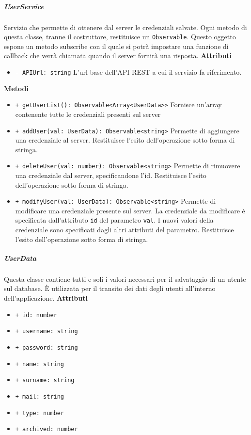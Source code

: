 \subparagraph{UserService}
Servizio che permette di ottenere dal server le credenziali salvate. Ogni metodo di questa classe, tranne il costruttore, restituisce un \texttt{Observable}. Questo oggetto espone un metodo subscribe con il quale si potrà impostare una funzione di callback che verrà chiamata quando il server fornirà una risposta. \newline
\textbf{Attributi}
\begin{itemize}
	\item \texttt{- APIUrl: string}
	L'url base dell'API REST a cui il servizio fa riferimento.
\end{itemize}
\textbf{Metodi}
\begin{itemize}
	\item \texttt{+ getUserList(): Observable<Array<UserData>>} \newline
	Fornisce un'array contenente tutte le credenziali presenti sul server
	\item \texttt{+ addUser(val: UserData): Observable<string>} \newline
	Permette di aggiungere una credenziale al server. Restituisce l'esito dell'operazione sotto forma di stringa.
	\item \texttt{+ deleteUser(val: number): Observable<string>} \newline
	Permette di rimuovere una credenziale dal server, specificandone l'id. Restituisce l'esito dell'operazione sotto forma di stringa.
	\item \texttt{+ modifyUser(val: UserData): Observable<string>} \newline
	Permette di modificare una credenziale presente sul server. La credenziale da modificare è specificata dall'attributo \texttt{id} del parametro \texttt{val}. I nuovi valori della credenziale sono specificati dagli altri attributi del parametro. Restituisce l'esito dell'operazione sotto forma di stringa.
\end{itemize}
\subparagraph{UserData}
Questa classe contiene tutti e soli i valori necessari per il salvataggio di un utente sul database. È utilizzata per il transito dei dati degli utenti all'interno dell'applicazione. \newline
\textbf{Attributi}
\begin{itemize}
	\item \texttt{+ id: number}
	\item \texttt{+ username: string}
	\item \texttt{+ password: string}
	\item \texttt{+ name: string}
	\item \texttt{+ surname: string}
	\item \texttt{+ mail: string}
	\item \texttt{+ type: number}
	\item \texttt{+ archived: number}
\end{itemize}
